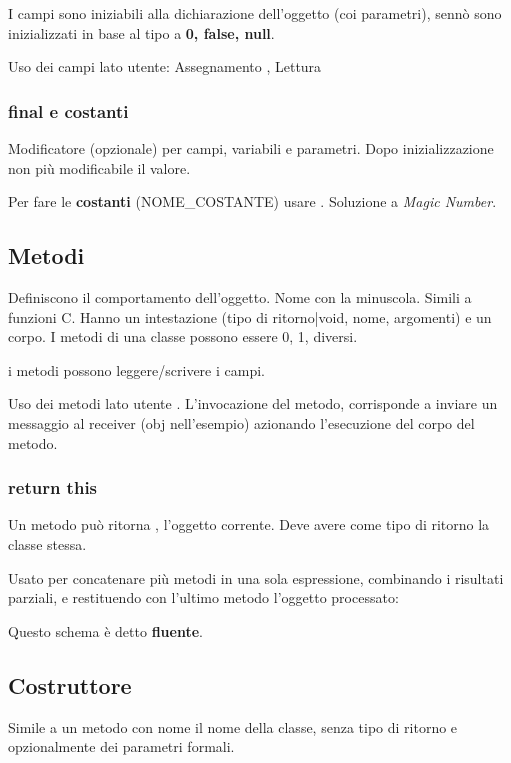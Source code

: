 I campi sono iniziabili alla dichiarazione dell'oggetto (coi parametri), sennò sono inizializzati in base al tipo a \textbf{0, false, null}.

Uso dei campi lato utente: Assegnamento , Lettura 

\subsubsection{final e costanti}
Modificatore (opzionale) per campi, variabili e parametri. Dopo inizializzazione non più modificabile il valore.


Per fare le \textbf{costanti} (NOME\_COSTANTE) usare . Soluzione a \textit{Magic Number}.

\subsection{Metodi}
Definiscono il comportamento dell'oggetto. Nome con la minuscola.
Simili a funzioni C. Hanno un intestazione (tipo di ritorno|void, nome, argomenti) e un corpo.
I metodi di una classe possono essere 0, 1, diversi.

i metodi possono leggere/scrivere i campi.

Uso dei metodi lato utente . L'invocazione del metodo, corrisponde a inviare un messaggio al receiver (obj nell'esempio) azionando l'esecuzione del corpo del metodo.


\subsubsection{return this}
Un metodo può ritorna , l'oggetto corrente. Deve avere come tipo di ritorno la classe stessa.

Usato per concatenare più metodi in una sola espressione, combinando i risultati parziali, e restituendo con l'ultimo metodo l'oggetto processato:


Questo schema è detto \textbf{fluente}.

\subsection{Costruttore}
Simile a un metodo con nome il nome della classe, senza tipo di ritorno e opzionalmente dei parametri formali.

